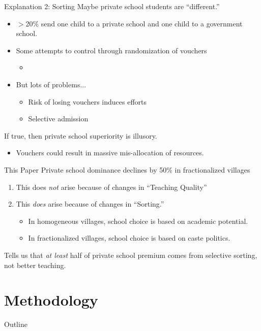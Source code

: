 \documentclass{beamer}
\begin{document}
\begin{frame}{Explanation 2: Sorting}
Maybe private school students are ``different.''
\pause
	\begin{itemize}
			\item $>$20\%  send one child to a private school and one child to a government school.
			\pause
		\item Some attempts to control through randomization of vouchers
			\begin{itemize}
				\item \cite{Angrist:2002up, Bellei:2008uu}
			\end{itemize}
		\pause
		\item But lots of problems...
			\begin{itemize}
				\item Risk of losing vouchers induces efforts
				\item Selective admission
			\end{itemize}
	\end{itemize}	

\pause
If true, then private school superiority is illusory. 
\begin{itemize}
	\item Vouchers could result in massive mis-allocation of resources.
\end{itemize}
\end{frame}


\begin{frame}{This Paper}
\pause	
Private school dominance declines by 50\% in fractionalized villages
	\pause
\begin{enumerate}
	\item This does \emph{not} arise because of changes in ``Teaching Quality''
	\item This \emph{does} arise because of changes in ``Sorting.''
	\pause
		\begin{itemize}
			\item In homogeneous villages, school choice is based on academic potential.
			\pause
			\item In fractionalized villages, school choice is based on caste politics.
		\end{itemize}
\end{enumerate}
\pause
Tells us that \emph{at least} half of private school premium comes from selective sorting, not better teaching.
\end{frame}



\section{Methodology}\label{}
\begin{frame}{Outline}
	\tableofcontents[currentsection]
\end{frame}
\end{document}

